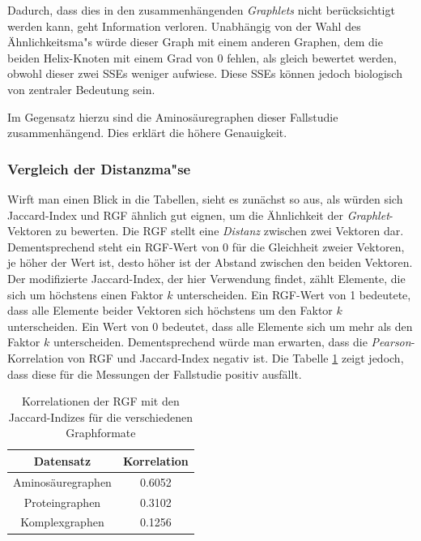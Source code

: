 \documentclass{report}
\begin{document}
Dadurch, dass dies in den zusammenh\"angenden \textit{Graphlets} nicht ber\"ucksichtigt werden kann, geht Information verloren. Unabh\"angig von der Wahl des \"Ahnlichkeitsma"s w\"urde dieser Graph mit einem anderen Graphen, dem die beiden Helix-Knoten mit einem Grad von 0 fehlen, als gleich bewertet werden, obwohl dieser zwei SSEs weniger aufwiese. Diese SSEs k\"onnen jedoch biologisch von zentraler Bedeutung sein.

Im Gegensatz hierzu sind die Aminos\"auregraphen dieser Fallstudie zusammenh\"angend. Dies erkl\"art die h\"ohere Genauigkeit.


\subsubsection{Vergleich der Distanzma"se}

Wirft man einen Blick in die Tabellen, sieht es zun\"achst so aus, als w\"urden sich Jaccard-Index und RGF \"ahnlich gut eignen, um die \"Ahnlichkeit der \textit{Graphlet}-Vektoren zu bewerten. Die RGF stellt eine \emph{Distanz} zwischen zwei Vektoren dar. Dementsprechend steht ein RGF-Wert von 0 f\"ur die Gleichheit zweier Vektoren, je h\"oher der Wert ist, desto h\"oher ist der Abstand zwischen den beiden Vektoren. Der modifizierte Jaccard-Index, der hier Verwendung findet, z\"ahlt Elemente, die sich um h\"ochstens einen Faktor $k$ unterscheiden. Ein RGF-Wert von 1 bedeutete, dass alle Elemente beider Vektoren sich h\"ochstens um den Faktor $k$ unterscheiden. Ein Wert von 0 bedeutet, dass alle Elemente sich um mehr als den Faktor $k$ unterscheiden. Dementsprechend w\"urde man erwarten, dass die \textit{Pearson}-Korrelation von RGF und Jaccard-Index negativ ist. Die Tabelle \ref{tab:correlation} zeigt jedoch, dass diese f\"ur die Messungen der Fallstudie positiv ausf\"allt. 

\begin{table}
\begin{tabular}{ | c | c | }
\hline
Datensatz           & Korrelation \\ \hline
Aminos\"auregraphen &   0.6052    \\ \hline
Proteingraphen      &   0.3102    \\ \hline      
Komplexgraphen      &   0.1256    \\ \hline
\end{tabular}
\caption{Korrelationen der RGF mit den Jaccard-Indizes f\"ur die verschiedenen Graphformate}
\label{tab:correlation}

\end{table}
\end{document}
